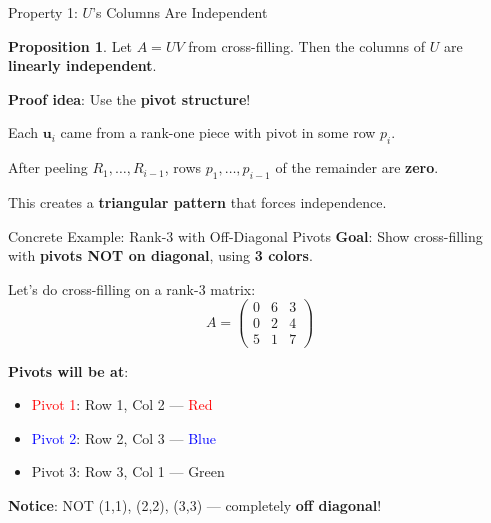 \documentclass[10pt]{beamer}
\theoremstyle{definition}
\newtheorem{prop}{Proposition}[section]
\newcommand{\x}[1]{\alert{\textbf{#1}}}
\begin{document}
\begin{frame}{Property 1: $U$'s Columns Are Independent}
\begin{prop}
Let $A = UV$ from cross-filling. Then the columns of $U$ are \x{linearly independent}.
\end{prop}

\vfill
\textbf{Proof idea}: Use the \x{pivot structure}!

Each $\mathbf{u}_i$ came from a rank-one piece with pivot in some row $p_i$.

After peeling $R_1, \ldots, R_{i-1}$, rows $p_1, \ldots, p_{i-1}$ of the remainder are \x{zero}.

This creates a \x{triangular pattern} that forces independence.
\end{frame}

\begin{frame}[fragile]{Concrete Example: Rank-3 with Off-Diagonal Pivots}
\x{Goal}: Show cross-filling with \x{pivots NOT on diagonal}, using \x{3 colors}.

\vfill
Let's do cross-filling on a rank-3 matrix:
$$A = \begin{pmatrix} 0 & 6 & 3 \\ 0 & 2 & 4 \\ 5 & 1 & 7 \end{pmatrix}$$

\vfill
\x{Pivots will be at}:
\begin{itemize}
\item \textcolor{red}{Pivot 1}: Row 1, Col 2 — \textcolor{red}{Red}
\item \textcolor{blue}{Pivot 2}: Row 2, Col 3 — \textcolor{blue}{Blue}
\item \textcolor{green!50!black}{Pivot 3}: Row 3, Col 1 — \textcolor{green!50!black}{Green}
\end{itemize}

\x{Notice}: NOT (1,1), (2,2), (3,3) — completely \x{off diagonal}!
\end{frame}
\end{document}
